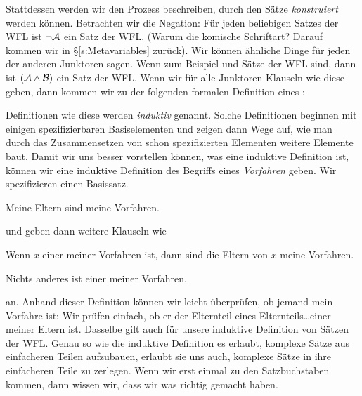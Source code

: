 Stattdessen werden wir den Prozess beschreiben, durch den Sätze \emph{konstruiert} werden können. Betrachten wir die Negation: Für jeden beliebigen Satzes  der WFL ist $\neg \mathcal{A}$ ein Satz der WFL. (Warum die komische Schriftart? Darauf kommen wir in \S\ref{s:Metavariables} zurück). Wir können ähnliche Dinge für jeden der anderen Junktoren sagen. Wenn zum Beispiel  und  Sätze der WFL sind, dann ist $(\mathcal{A}\wedge \mathcal{B})$ ein Satz der WFL. Wenn wir für alle Junktoren Klauseln wie diese geben, dann kommen wir zu der folgenden formalen Definition eines :

Definitionen wie diese werden \emph{induktiv} genannt. Solche Definitionen beginnen mit einigen spezifizierbaren Basiselementen und zeigen dann Wege auf, wie man durch das Zusammensetzen von schon spezifizierten Elementen weitere Elemente baut. Damit wir uns besser vorstellen können, was eine induktive Definition ist, können wir eine induktive Definition des Begriffs eines \emph{Vorfahren} geben. Wir spezifizieren einen Basissatz.
	\begin{ebullet}
		\item Meine Eltern sind meine Vorfahren.
	\end{ebullet}
und geben dann weitere Klauseln wie
	\begin{ebullet}
		\item Wenn $x$ einer meiner Vorfahren ist, dann sind die Eltern von $x$ meine Vorfahren.
		\item Nichts anderes ist einer meiner Vorfahren.
	\end{ebullet}
an. Anhand dieser Definition können wir leicht überprüfen, ob jemand mein Vorfahre ist: Wir prüfen einfach, ob er der Elternteil eines Elternteils\dots einer meiner Eltern ist. Dasselbe gilt auch für unsere induktive Definition von Sätzen der WFL. Genau so wie die induktive Definition es erlaubt, komplexe Sätze aus einfacheren Teilen aufzubauen, erlaubt sie uns auch, komplexe Sätze in ihre einfacheren Teile zu zerlegen. Wenn wir erst einmal zu den Satzbuchstaben kommen, dann wissen wir, dass wir was richtig gemacht haben. 

